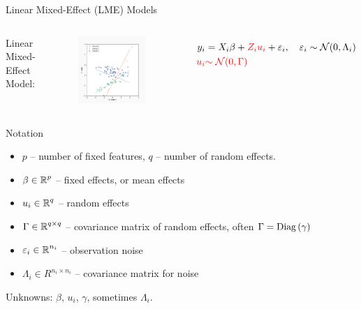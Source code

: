 \documentclass[8pt]{beamer}
\begin{document}
\begin{frame}{Linear Mixed-Effect (LME) Models}
\begin{columns}[T,onlytextwidth]
   	
    	\centering  Linear Mixed-Effect Model:
   	\begin{figure}
   		\includegraphics[width=0.9\textwidth]{Figures/lme_example_random_prediction}
   	\end{figure}
   	   		\[
   		\begin{split}
   			y_i & = X_i\beta + {\color{red}Z_i u_i} + \varepsilon_i, \quad \varepsilon_i \sim \operatorname{\mathcal{N}}(0, \Lambda_i) \\
   			{\color{red} u_i} & {\color{red}\sim \operatorname{\mathcal{N}}(0, \Gamma)}
   		\end{split}
   		\]

   	
  \end{columns}
\end{frame}

\begin{frame}{Notation}
   	
   	\begin{itemize}
   		\item $p$ -- number of fixed features, $q$ -- number of random effects.
   		\item $\beta \in \operatorname{\mathbb{R}}^p$ -- fixed effects, or mean effects
   		\item $u_i \in \operatorname{\mathbb{R}}^q$ -- random effects
   		\item $\Gamma \in \operatorname{\mathbb{R}}^{q \times q}$ -- covariance matrix of random effects, often $\Gamma = \operatorname{Diag}{(\gamma)}$
   		\item $\varepsilon_i \in \operatorname{\mathbb{R}}^{n_i}$ -- observation noise
   		\item $\Lambda_i \in R^{n_i \times n_i}$ -- covariance matrix for noise
   	\end{itemize}
   	Unknowns: $\beta$, $u_i$, $\gamma$, sometimes $\Lambda_i$.
\end{frame}
\end{document}
